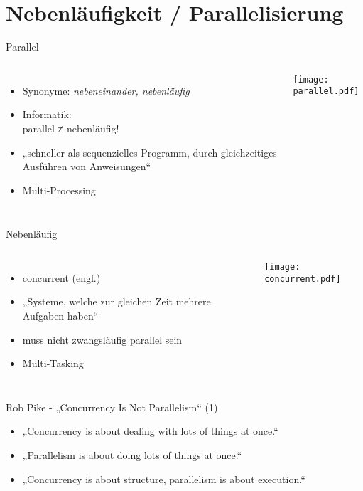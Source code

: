 \documentclass[compress]{beamer}
\begin{document}
\section{Nebenläufigkeit / Parallelisierung}
  \begin{frame}{Parallel}
  \setcounter{framenumber}{1}
    \begin{columns}[c]
      \begin{itemize}
        \item Synonyme: \textit{nebeneinander, nebenläufig}
        \item Informatik:\\parallel ≠ nebenläufig!
        \item „schneller als sequenzielles Programm, durch gleichzeitiges Ausführen von \alert{Anweisungen}“
        \item Multi-Processing
      \end{itemize}
    \texttt{[image: parallel.pdf]}
    \end{columns}
  \end{frame}


  \begin{frame}{Nebenläufig}
    \begin{columns}[c]
      \begin{itemize}
        \item concurrent (engl.)
        \item „Systeme, welche zur gleichen Zeit mehrere \alert{Aufgaben} haben“
        \item muss nicht zwangsläufig parallel sein
        \item Multi-Tasking
      \end{itemize}
      \texttt{[image: concurrent.pdf]}
    \end{columns}
  \end{frame}
  

  \begin{frame}{Rob Pike - „Concurrency Is Not Parallelism“ (1)}
    \begin{itemize}
      \item „Concurrency is about \alert{dealing with} lots of things at once.“
      \item „Parallelism is about \alert{doing} lots of things at once.“
      \item „Concurrency is about structure, parallelism is about execution.“
    \end{itemize}
  \end{frame}
\end{document}
